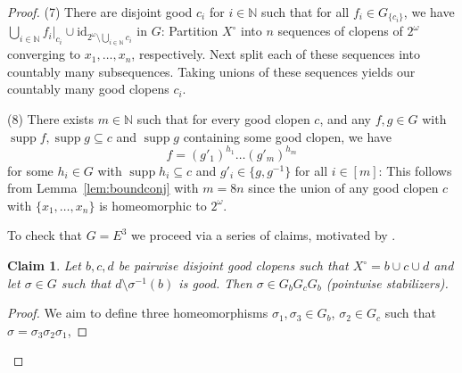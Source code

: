 \documentclass[12pt,a4paper,reqno]{amsart}
\numberwithin{equation}{section}
\theoremstyle{plain}
\newtheorem{claim}[thm]{Claim}
\theoremstyle{definition}
\newcommand*{\proofclaimname}{Proof}
\newenvironment{proofclaim}[1][\proofclaimname]{\begin{proof}[#1]\renewcommand*{\qedsymbol}{\(\diamond\)}}{\end{proof}}
\newcommand{\id}{\mathrm{id}}
\newcommand{\N}{\mathbb{N}}
\DeclareMathOperator{\supp}{supp}
\begin{document}
\begin{proof}
 (7) There are disjoint good  $c_i$ for $i\in\N$ such that for all $f_i\in G_{\{c_i\}}$,
 we have $\bigcup_{i\in\N} f_i|_{c_i} \cup \id_{2^\omega\setminus \bigcup_{i\in\N} c_i}$ in $G$:
 Partition $X^\circ$ into $n$ sequences of clopens of $2^\omega$ converging to $x_1,\dots,x_n$, respectively.
 Next split each of these sequences into countably many subsequences. 
 Taking unions of these sequences yields our countably many good clopens $c_i$.

 (8) There exists $m\in\N$ such that for every good clopen $c$, and  any $f,g\in G$ with
 $\supp f,\supp g \subseteq c$ and $\supp g$ containing some good clopen,  we have
 \[ f = (g'_1)^{h_1} \dots (g'_m)^{h_m} \]
 for some $h_i\in G$ with $\supp h_i \subseteq c$ and $g'_i\in \{g,g^{-1}\}$ for all $i\in [m]$:
 This follows from Lemma~\ref{lem:boundconj} with $m=8n$ since the union of any good clopen $c$ with $\{x_1,\dots,x_n\}$
 is homeomorphic to $2^\omega$.

 To check that $G=E^3$ we proceed via a series of claims, motivated by
\cite[Lemma 2.1]{Ga:GCSP}.

\begin{claim} \label{cl:GbGcGb}
Let $b,c,d$ be pairwise disjoint good clopens such that $X^\circ=b\cup c\cup d$ and let $\sigma\in G$ such that  
 $d\setminus\sigma^{-1}(b)$ is good.
Then $\sigma\in G_bG_cG_b$ (pointwise stabilizers).
\end{claim}


\begin{proofclaim}
We aim to define three homeomorphisms $\sigma_1,\sigma_3\in G_b$, $\sigma_2\in G_c$ such that
$\sigma=\sigma_3\sigma_2\sigma_1$,


\end{proofclaim}
\end{proof}
\end{document}

